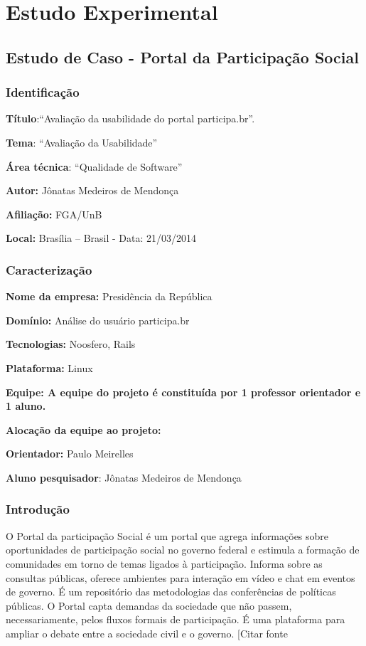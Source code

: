 \chapter{Estudo Experimental}

\section{Estudo de Caso - Portal da Participação Social}

\subsection{Identificação}

\textbf{Título}:“Avaliação da usabilidade do portal participa.br”.

\textbf{Tema}: “Avaliação da Usabilidade” 

\textbf{Área técnica}: “Qualidade de Software” 

\textbf{Autor:} Jônatas Medeiros de Mendonça  

\textbf{Afiliação:} FGA/UnB 

\textbf{Local:} Brasília – Brasil - Data:  21/03/2014 

\subsection{Caracterização}

\textbf{Nome da empresa:} Presidência da República

\textbf{Domínio:} Análise do usuário participa.br

\textbf{Tecnologias:} Noosfero, Rails 

\textbf{Plataforma:} Linux 

\textbf{Equipe: A equipe do projeto é constituída por 1 professor orientador e 1 aluno.} 

\textbf{Alocação da equipe ao projeto:} 

\textbf{Orientador:} Paulo Meirelles

\textbf{Aluno pesquisador}: Jônatas Medeiros de Mendonça


\subsection{Introdução}

O Portal da participação Social é um portal que agrega informações sobre oportunidades de participação social no governo federal e estimula a formação de comunidades em torno de temas ligados à participação. Informa sobre as consultas públicas, oferece ambientes para interação em vídeo e chat em eventos de governo. É um repositório das metodologias das conferências de políticas públicas. O Portal capta demandas da sociedade que não passem, necessariamente, pelos fluxos formais de participação. É uma plataforma para ampliar o debate entre a sociedade civil e o governo. [Citar fonte	

